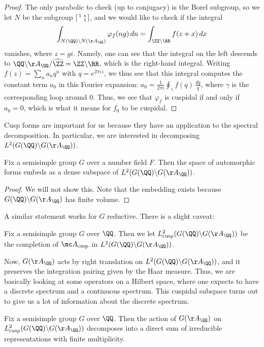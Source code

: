 \documentclass[../notes.tex]{subfiles}
\begin{document}
\begin{proof}
	The only parabolic to check (up to conjugacy) is the Borel subgroup, so we let $N$ be the subgroup $\begin{bsmallmatrix}
		1 & * \\ & 1
	\end{bsmallmatrix}$, and we would like to check if the integral
	\[\int_{N(\QQ)\backslash N(\AA_\QQ)}\varphi_f(ng)\,dn=\int_{\ZZ\backslash\RR}f(z+x)\,dx\]
	vanishes, where $z=gi$. Namely, one can see that the integral on the left descends to $\QQ\backslash\AA_\QQ/\widehat{\ZZ}=\ZZ\backslash\RR$, which is the right-hand integral. Writing $f(z)=\sum_na_nq^n$ with $q=e^{2\pi iz}$, we thus see that this integral computes the constant term $a_0$ in this Fourier expansion: $a_0=\frac1{2\pi i}\oint_{\gamma}f(q)\,\frac{dq}q$, where $\gamma$ is the corresponding loop around $0$. Thus, we see that $\varphi_f$ is cuspidal if and only if $a_0=0$, which is what it means for $f_0$ to be cuspidal.
\end{proof}
Cusp forms are important for us because they have an application to the spectral decomposition. In particular, we are interested in decomposing $L^2(G(\QQ)\backslash G(\AA_\QQ))$.
\begin{lemma}
	Fix a semisimple group $G$ over a number field $F$. Then the space of automorphic forms embeds as a dense subspace of $L^2(G(\QQ)\backslash G(\AA_\QQ))$.
\end{lemma}
\begin{proof}
	We will not show this. Note that the embedding exists because $G(\QQ)\backslash G(\AA_\QQ)$ has finite volume.
\end{proof}
\begin{remark}
	A similar statement works for $G$ reductive. There is a slight caveat: 
\end{remark}
\begin{notation}
	Fix a semisimple group $G$ over $\QQ$. Then we let $L^2_{\mathrm{cusp}}(G(\QQ)\backslash G(\AA_\QQ))$ be the completion of $\mc A_{\mathrm{cusp}}$ in $L^2(G(\QQ)\backslash G(\AA_\QQ))$.
\end{notation}
Now, $G(\AA_\QQ)$ acts by right translation on $L^2(G(\QQ)\backslash G(\AA_\QQ))$, and it preserves the integration pairing given by the Haar measure. Thus, we are basically looking at some operators on a Hilbert space, where one expects to have a discrete spectrum and a continuous spectrum. This cuspidal subspace turns out to give us a lot of information about the discrete spectrum.
\begin{proposition}
	Fix a semisimple group $G$ over $\QQ$. Then the action of $G(\AA_\QQ)$ on $L^2_{\mathrm{cusp}}(G(\QQ)\backslash G(\AA_\QQ))$ decomposes into a direct sum of irreducible representations with finite multiplicity.
\end{proposition}
\end{document}
